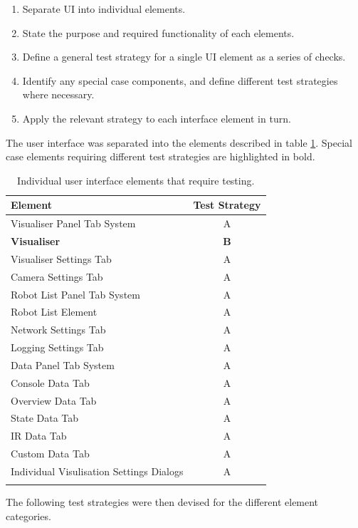 \begin{enumerate}
 \item Separate UI into individual elements.
 \item State the purpose and required functionality of each elements.
 \item Define a general test strategy for a single UI element as a series of checks.
 \item Identify any special case components, and define different test strategies where necessary.
 \item Apply the relevant strategy to each interface element in turn.
\end{enumerate}

\vspace{0.5cm}

The user interface was separated into the elements described in table \ref{tab:UserInterfaceElements}. Special case elements requiring different test strategies are highlighted in bold.

\begin{longtable}{ l c }
\caption[User Interface Elements]{Individual user interface elements that require testing.}\\
 Element & Test Strategy\\
 \hline
 Visualiser Panel Tab System & A \\
 \textbf{Visualiser} & \textbf{B} \\
 Visualiser Settings Tab & A \\
 Camera Settings Tab & A \\
 Robot List Panel Tab System & A \\
 Robot List Element & A \\
 Network Settings Tab & A \\
 Logging Settings Tab & A \\
 Data Panel Tab System & A \\
 Console Data Tab & A \\
 Overview Data Tab & A \\
 State Data Tab & A \\
 IR Data Tab & A \\
 Custom Data Tab & A \\
 Individual Visulisation Settings Dialogs & A \\
 \bottomrule
 \label{tab:UserInterfaceElements}
\end{longtable}

The following test strategies were then devised for the different element categories.

